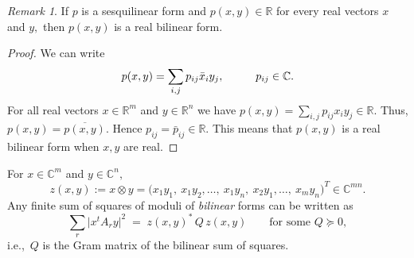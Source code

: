 \documentclass[12pt,a4paper]{amsart}
\theoremstyle{plain}
\theoremstyle{remark}
\newtheorem{remark}{Remark}
\theoremstyle{definition}
\def \R {\mathbb{R}}
\def \C {\mathbb{C}}
\begin{document}
\begin{remark}
	If $p$ is a sesquilinear form and $p(x,y) \in \R$ for every real vectors $x$ and $y,$ then $p(x,y)$ is a real bilinear form.
\end{remark}
\begin{proof}
	We can write 
	$$
	p(x,y) = \sum_{i,j} p_{ij} \bar{x}_i y_j ,   \hspace{1 cm} p_{ij} \in \C.
	$$ 
	For all real vectors $x \in \R^m$ and $y\in \R^n$ we have
	$\displaystyle p(x,y) = \sum_{i,j} p_{ij} x_i y_j \in \R .$ Thus,  $p(x,y) = \overline{p(x,y)}.$ Hence $p_{ij} = \bar{p}_{ij} \in \R.$ This means that $p(x,y)$ is a real bilinear form when $x,y$ are real.
\end{proof}
For $x\in \C^m$ and $y\in \C^n,$
\[
z(x,y):=x\otimes y =\bigl(x_{1}y_{1},\ x_{1}y_{2},\ldots, \ x_{1}y_{n},\ x_{2}y_{1},\ldots,\ x_{m}y_{n}\bigr)^{T}\in \mathbb C^{mn}.
\]
Any finite sum of squares of moduli of \emph{bilinear} forms can be written as
\[
\sum_{r}\bigl|x^{t}A_{r}y\bigr|^{2}
\;=\;
z(x,y)^{*}\,Q\,z(x,y)
\qquad\text{for some } Q\succeq 0,
\]
i.e.,\ $Q$ is the Gram matrix of the bilinear sum of squares.
\end{document}
